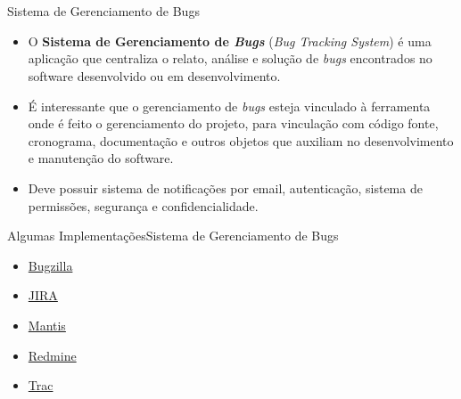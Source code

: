 \section{\insertlecture}
\onlytitleframe{\insertlecture}

\begin{frame}{Sistema de Gerenciamento de Bugs}
\begin{itemize}[<+-| alert@+>]
\item O {\bf Sistema de Gerenciamento de {\em Bugs}} ({\em Bug Tracking System})  é uma aplicação que centraliza o relato, análise e solução de {\em bugs} encontrados no software desenvolvido ou em desenvolvimento.
\item É interessante que o gerenciamento de {\em bugs} esteja vinculado à 
ferramenta onde é feito o gerenciamento do projeto, para vinculação com 
código fonte, cronograma, documentação e outros objetos que auxiliam no 
desenvolvimento e manutenção do software.
\item Deve possuir sistema de notificações por email, autenticação, 
 sistema de permissões, segurança e confidencialidade.
\end{itemize}
\end{frame}

\begin{frame}{Algumas Implementações}{Sistema de Gerenciamento de Bugs}

\begin{itemize}
\item \href{https://www.bugzilla.org/}{Bugzilla}
\item \href{https://www.atlassian.com/software/jira}{JIRA}
\item \href{https://www.mantisbt.org/}{Mantis}
\item \href{http://www.redmine.org/}{Redmine}
\item \href{http://trac.edgewall.org/}{Trac}
\end{itemize}

\end{frame}
